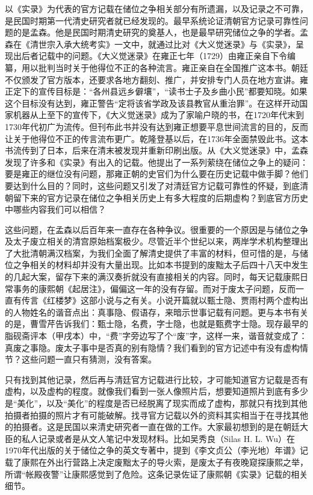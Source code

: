 以《实录》为代表的官方记载在储位之争相关部分有所遗漏，以及记录之不可靠，是民国时期第一代清史研究者就已经发现的。最早系统论证清朝官方记录可靠性问题的是孟森。他是民国时期清史研究的奠基人，也是最早研究储位之争的学者。孟森在《清世宗入承大统考实》一文中，就通过比对《大义觉迷录》与《实录》，呈现出后者记载中的问题。《大义觉迷录》在雍正七年（1729）由雍正亲自下令编纂，用以批判当时关于他得位不正的各种流言。雍正亲自在全国推广这本书。朝廷不仅颁发了官方版本，还要求各地方翻刻、推广，并安排专门人员在地方宣讲。雍正定下的宣传目标是：“各州县远乡僻壤”，“读书士子及乡曲小民”都要知晓。如果这个目标没有达到，雍正警告“定将该省学政及该县教官从重治罪”。在这样开动国家机器从上至下的宣传下，《大义觉迷录》成为了家喻户晓的书，在1720年代末到1730年代初广为流传。但刊布此书并没有达到雍正想要平息世间流言的目的，反而让关于他得位不正的传言流布更广。乾隆登基以后，在1736年全面禁毁此书。这本书流传到了日本，后来在清末被发现并重新印刷出版。从《大义觉迷录》中，孟森发现了许多和《实录》有出入的记载。他提出了一系列萦绕在储位之争上的疑问：要是雍正的继位没有问题，那雍正朝的史官们为什么要在历史记载中做手脚？他们要达到什么目的？同时，这些问题又引发了对清廷官方记载可靠性的怀疑，到底清朝留下来的官方记录在储位之争相关历史上有多大程度的后期虚构？到底官方历史中哪些内容我们可以相信？



这些问题，在孟森以后百年来一直存在各种争议。很重要的一个原因是与储位之争及太子废立相关的清宫原始档案极少。尽管近半个世纪以来，两岸学术机构整理出了大批清朝满汉档案，为我们全面了解清史提供了丰富的材料，但可惜的是，与储位之争相关的材料却并没有大量出现。比如本书提到的废黜太子后四十八天中发生的几起大案，留存下来的满汉奏折就没有直接相关的内容。同时，每天记载康熙日常事务的康熙朝《起居注》，偏偏这一年的没有存留。而对于废太子问题，反而一直有传言《红楼梦》这部小说与之有关。小说开篇就以甄士隐、贾雨村两个虚构出的人物姓名的谐音点出：真事隐、假语存，来暗示世事记载有问题。更与本书有关的是，曹雪芹告诉我们：甄士隐，名费，字士隐，也就是甄费字士隐。现存最早的脂砚斋评本（甲戌本）中，“费”字旁边写了个“废”字，这样一来，谐音就变成了：真废之事隐。废太子事中是否真的别有隐情？我们看到的官方记述中有没有虚构情节？这些问题一直只有猜测，没有答案。



只有找到其他记录，然后再与清廷官方记载进行比较，才可能知道官方记载是否有虚构，以及虚构的程度。就像我们看到一张人像照片后，想要知道照片到底有多少是“美化”，以及“美化”的程度是否已经脱离了现实而成了虚构，那就只有找到其他拍摄者拍摄的照片才有可能破解。找寻官方记载以外的资料其实相当于在寻找其他的拍摄者。这是民国以来清史研究者一直在做的工作。大家最初想到的是在朝廷大臣的私人记录或者是从文人笔记中发现材料。比如吴秀良（Silas H. L. Wu）在1970年代出版的关于储位之争的英文专著中，提到《李文贞公（李光地）年谱》记载了康熙在外出行营路上决定废黜太子的导火索，是废太子有夜晚窥探康熙之举，所谓“帐殿夜警”让康熙感觉到了危险。这条记录佐证了康熙朝《实录》记载的相关细节。


